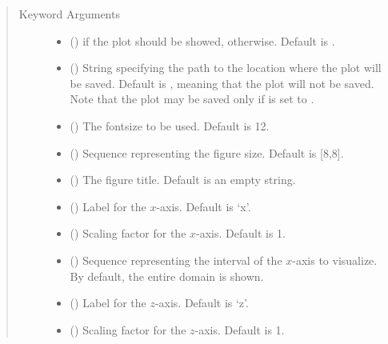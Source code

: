 \documentclass[letterpaper,10pt,english]{sphinxmanual}
\begin{document}
\begin{fulllineitems}
\begin{quote}
\begin{description}
\item[{Keyword Arguments}] \leavevmode\begin{itemize}
\item {} 
 () \textendash{}  if the plot should be showed,  otherwise. Default is .

\item {} 
 () \textendash{} String specifying the path to the location where the plot will be saved. Default is ,
meaning that the plot will not be saved. Note that the plot may be saved only if 
is set to .

\item {} 
 () \textendash{} The fontsize to be used. Default is 12.

\item {} 
 () \textendash{} Sequence representing the figure size. Default is {[}8,8{]}.

\item {} 
 () \textendash{} The figure title. Default is an empty string.

\item {} 
 () \textendash{} Label for the \(x\)-axis. Default is ‘x’.

\item {} 
 () \textendash{} Scaling factor for the \(x\)-axis. Default is 1.

\item {} 
 () \textendash{} Sequence representing the interval of the \(x\)-axis to visualize.
By default, the entire domain is shown.

\item {} 
 () \textendash{} Label for the \(z\)-axis. Default is ‘z’.

\item {} 
 () \textendash{} Scaling factor for the \(z\)-axis. Default is 1.


\end{itemize}
\end{description}
\end{quote}
\end{fulllineitems}
\end{document}
